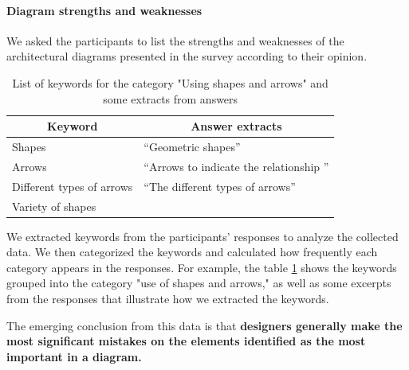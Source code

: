 \documentclass[sigconf]{acmart}
\begin{document}
\paragraph{Diagram strengths and weaknesses}

We asked the participants to list the strengths and weaknesses of the architectural diagrams presented in the survey according to their opinion.

\begin{table}[h]
\caption{List of keywords for the category "Using shapes and arrows" and some extracts from answers}
\label{tab:keyword-category}
\begin{tabular}{@{}ll@{}}
\toprule
\multicolumn{1}{c}{Keyword} & \multicolumn{1}{c}{Answer extracts}             \\ \midrule
Shapes                      & \enquote{Geometric shapes}   \\
Arrows                      & \enquote{Arrows to indicate the relationship }                                       \\
Different types of arrows   & \enquote{The different types of arrows}                                        \\
Variety of shapes           &                                           \\ \bottomrule
\end{tabular}
\end{table}

We extracted keywords from the participants' responses to analyze the collected data. We then categorized the keywords and calculated how frequently each category appears in the responses. For example, the table \ref{tab:keyword-category} shows the keywords grouped into the category "use of shapes and arrows," as well as some excerpts from the responses that illustrate how we extracted the keywords.


The emerging conclusion from this data is that \textbf{designers generally make the most significant mistakes on the elements identified as the most important in a diagram.}
\end{document}
